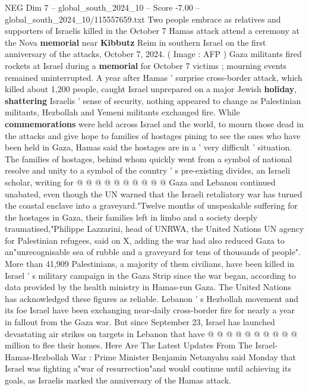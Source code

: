 \begin{textsample}{NEG Dim 7 – global\_south\_2024\_10 – Score -7.00 – global\_south\_2024\_10/115557659.txt}  \label{ex:f7_neg_243}
Two people embrace as relatives and supporters of Israelis killed in the October 7 Hamas attack attend a ceremony at the Nova \textbf{memorial} near \textbf{Kibbutz} Reim in southern Israel on the first anniversary of the attacks, October 7, 2024. ( Image : AFP ) Gaza militants fired rockets at Israel during a \textbf{memorial} for October 7 victims ; mourning events remained uninterrupted.
A year after Hamas ' surprise cross-border attack, which killed about 1,200 people, caught Israel unprepared on a major Jewish \textbf{holiday}, \textbf{shattering} Israelis ' sense of security, nothing appeared to change as Palestinian militants, Hezbollah and Yemeni militants exchanged fire.
While \textbf{commemorations} were held across Israel and the world, to mourn those dead in the attacks and give hope to families of hostages pining to see the ones who have been held in Gaza, Hamas said the hostages are in a ' very difficult ' situation.
The families of hostages, behind whom quickly went from a symbol of national resolve and unity to a symbol of the country ' s pre-existing divides, an Israeli scholar, writing for @ @ @ @ @ @ @ @ @ @ Gaza and Lebanon continued unabated, even though the UN warned that the Israeli retaliatory war has turned the coastal enclave into a graveyard."Twelve months of unspeakable suffering for the hostages in Gaza, their families left in limbo and a society deeply traumatised,"Philippe Lazzarini, head of UNRWA, the United Nations UN agency for Palestinian refugees, said on X, adding the war had also reduced Gaza to an"unrecognisable sea of rubble and a graveyard for tens of thousands of people".
More than 41,909 Palestinians, a majority of them civilians, have been killed in Israel ' s military campaign in the Gaza Strip since the war began, according to data provided by the health ministry in Hamas-run Gaza.
The United Nations has acknowledged these figures as reliable.
Lebanon ' s Hezbollah movement and its foe Israel have been exchanging near-daily cross-border fire for nearly a year in fallout from the Gaza war.
But since September 23, Israel has launched devastating air strikes on targets in Lebanon that have @ @ @ @ @ @ @ @ @ @ million to flee their homes.
Here Are The Latest Updates From The Israel-Hamas-Hezbollah War : Prime Minister Benjamin Netanyahu said Monday that Israel was fighting a"war of resurrection"and would continue until achieving its goals, as Israelis marked the anniversary of the Hamas attack.

\end{textsample}
